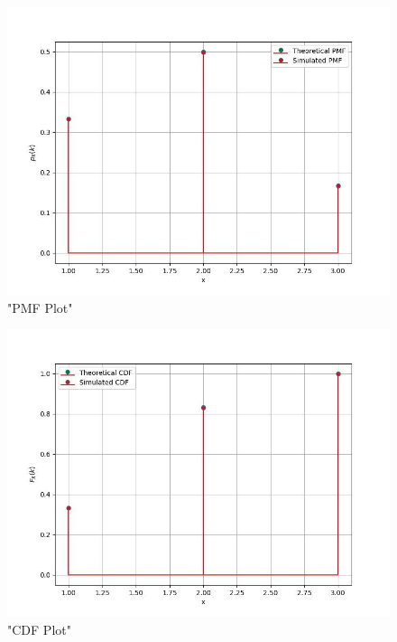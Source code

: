 \documentclass[journal]{IEEEtran}
\begin{document}
\begin{figure}[h!]
   \centering
   \includegraphics[width=\columnwidth]{figs/pmf.jpg}
   \caption{"PMF Plot"}
\end{figure}


\begin{figure}[h!]
   \centering
   \includegraphics[width=\columnwidth]{figs/cdf.jpg}
   \caption{"CDF Plot"}
\end{figure}
\end{document}
